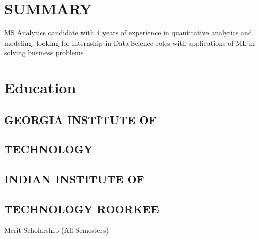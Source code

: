 \documentclass[]{deedy-resume-openfont}
\begin{document}
%
%

%
%


%
%

\begin{minipage}[t]{0.31\textwidth} 


\section{SUMMARY} 
MS Analytics candidate with 4 years of experience in quantitative analytics and modeling, looking for internship in Data Science roles with applications of ML in solving business problems


\section{Education} 
\subsection{GEORGIA INSTITUTE OF}{\raggedleft}
\subsection{TECHNOLOGY}{\raggedleft}
\sectionsep

\subsection{INDIAN INSTITUTE OF}
\subsection{TECHNOLOGY ROORKEE }
Merit Scholarship (All Semesters) \\
\sectionsep


\end{minipage}
\end{document}
